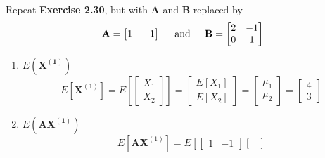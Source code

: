         Repeat \textbf{Exercise 2.30}, but with $\mathbf{A}$ and $\mathbf{B}$ replaced by
        \[
            \mathbf{A}
            =
            \begin{bmatrix}
                1 & -1
            \end{bmatrix}
            \hspace{0.2in}\text{and}\hspace{0.2in}
            \mathbf{B}
            =
            \begin{bmatrix}
                2 & -1 \\
                0 & 1
            \end{bmatrix}
        \]
        \begin{enumerate}[label=(\alph*)]
            \item $E\left(\mathbf{X^{(1)}}\right)$
            \[
                E\left[\mathbf{X}^{(1)}\right]
                = 
                E\left[
                    \begin{bmatrix}
                        X_1 \\
                        X_2
                    \end{bmatrix}
                \right]
                =
                \begin{bmatrix}
                    E[X_1] \\
                    E[X_2]
                \end{bmatrix}
                =
                \begin{bmatrix}
                    \mu_1 \\
                    \mu_2
                \end{bmatrix}
                =\begin{bmatrix}
                    4 \\
                    3
                \end{bmatrix}
            \]
            \item $E\left(\mathbf{A}\mathbf{X^{(1)}}\right)$
            \[
                E\left[\mathbf{A}\mathbf{X}^{(1)}\right]
                =
                E\left[
                    \begin{bmatrix}
                        1 & -1
                    \end{bmatrix}
                    \begin{bmatrix}

\end{bmatrix}\]
\end{enumerate}
